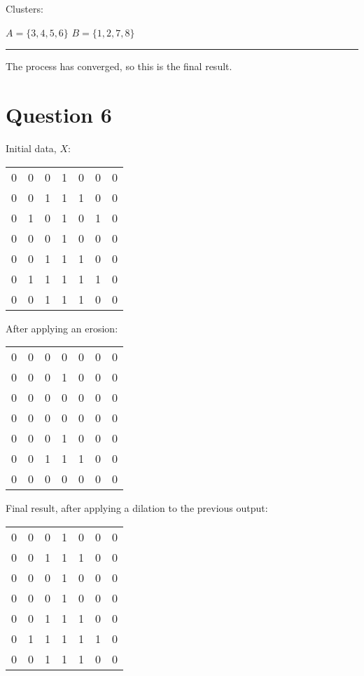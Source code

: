 \documentclass[11pt]{article}
\newcommand{\sectionline}{%
  \nointerlineskip \vspace{\baselineskip}%
  \rule{0.5\linewidth}{.7pt}\hspace{\fill}%
  \par\nointerlineskip \vspace{\baselineskip}
}
\begin{document}
Clusters:

$A = \{3,4,5,6\}$
$B = \{1,2,7,8\}$

\sectionline

The process has converged, so this is the final result.

\section*{Question 6}

Initial data, $X$:

\begin{tabular}{c c c c c c c}
0 & 0 & 0 & 1 & 0 & 0 & 0 \\
0 & 0 & 1 & 1 & 1 & 0 & 0 \\
0 & 1 & 0 & 1 & 0 & 1 & 0 \\
0 & 0 & 0 & 1 & 0 & 0 & 0 \\
0 & 0 & 1 & 1 & 1 & 0 & 0 \\
0 & 1 & 1 & 1 & 1 & 1 & 0 \\
0 & 0 & 1 & 1 & 1 & 0 & 0 \\
\end{tabular}

After applying an erosion:

\begin{tabular}{c c c c c c c}
0 & 0 & 0 & 0 & 0 & 0 & 0 \\
0 & 0 & 0 & 1 & 0 & 0 & 0 \\
0 & 0 & 0 & 0 & 0 & 0 & 0 \\
0 & 0 & 0 & 0 & 0 & 0 & 0 \\
0 & 0 & 0 & 1 & 0 & 0 & 0 \\
0 & 0 & 1 & 1 & 1 & 0 & 0 \\
0 & 0 & 0 & 0 & 0 & 0 & 0 \\
\end{tabular}

Final result, after applying a dilation to the previous output:

\begin{tabular}{c c c c c c c}
0 & 0 & 0 & 1 & 0 & 0 & 0 \\
0 & 0 & 1 & 1 & 1 & 0 & 0 \\
0 & 0 & 0 & 1 & 0 & 0 & 0 \\
0 & 0 & 0 & 1 & 0 & 0 & 0 \\
0 & 0 & 1 & 1 & 1 & 0 & 0 \\
0 & 1 & 1 & 1 & 1 & 1 & 0 \\
0 & 0 & 1 & 1 & 1 & 0 & 0 \\
\end{tabular}
\end{document}
